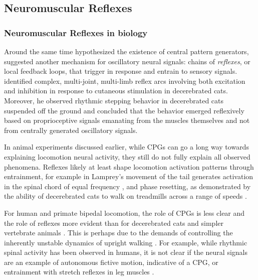 \subsection{Neuromuscular Reflexes}\label{sec:back_neuromuscular_reflexes}
\subsubsection{Neuromuscular Reflexes in biology}
Around the same time \citeauthor{brown1911intrinsic} hypothesized the existence
of central pattern generators, \citet{sherrington1910integrative,
sherrington1910flexion} suggested another mechanism for oscillatory neural
signals: chains of \emph{reflexes}, or local feedback loops, that trigger in
response and entrain to sensory signals. \citeauthor{sherrington1910integrative}
identified complex, multi-joint, multi-limb reflex arcs involving both
excitation and inhibition in response to cutaneous stimulation in decerebrated
cats. Moreover, he observed rhythmic stepping behavior in decerebrated cats
suspended off the ground and concluded that the behavior emerged reflexively
based on proprioceptive signals emanating from the muscles themselves and not
from centrally generated oscillatory signals.

In animal experiments discussed earlier, while CPGs can go a long way towards
explaining locomotion neural activity, they still do not fully explain all
observed phenomena. Reflexes likely at least shape locomotion activation
patterns through entrainment, for example in Lamprey's movement of the tail
generates activation in the spinal chord of equal frequency
\citep{mcclellan1993mechanosensory}, and phase resetting, as demonstrated by the
ability of decerebrated cats to walk on treadmills across a range of speeds
\citep{rossignol2000locomotion}.

For human and primate bipedal locomotion, the role of CPGs is less clear and
the role of reflexes more evident than for decerebrated cats and simpler
vertebrate animals \citep{mackay2002central, vaughan2003theories,
nielsen2003we}. This is perhaps due to the demands of controlling the inherently
unstable dynamics of upright walking \citep{capaday2002special}. For example,
while rhythmic spinal activity has been observed in humans, it is not clear if
the neural signals are an example of autonomous fictive motion, indicative of a
CPG, or entrainment with stretch reflexes in leg muscles
\citep{capaday2002special, stewart1991modulation}. 

